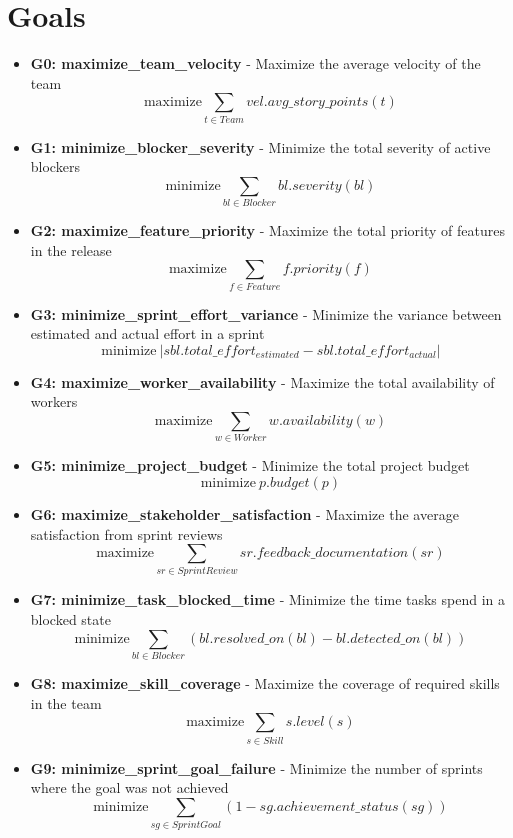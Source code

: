 \documentclass{article}
\begin{document}
\section{Goals}
\begin{itemize}
    \item \textbf{G0: maximize\_team\_velocity} - Maximize the average velocity of the team
        \[ \text{maximize} \sum_{t \in Team} vel.avg\_story\_points(t) \]
    \item \textbf{G1: minimize\_blocker\_severity} - Minimize the total severity of active blockers
        \[ \text{minimize} \sum_{bl \in Blocker} bl.severity(bl) \]
    \item \textbf{G2: maximize\_feature\_priority} - Maximize the total priority of features in the release
        \[ \text{maximize} \sum_{f \in Feature} f.priority(f) \]
    \item \textbf{G3: minimize\_sprint\_effort\_variance} - Minimize the variance between estimated and actual effort in a sprint
        \[ \text{minimize} \ | sbl.total\_effort_{estimated} - sbl.total\_effort_{actual} | \]
    \item \textbf{G4: maximize\_worker\_availability} - Maximize the total availability of workers
        \[ \text{maximize} \sum_{w \in Worker} w.availability(w) \]
    \item \textbf{G5: minimize\_project\_budget} - Minimize the total project budget
        \[ \text{minimize} \ p.budget(p) \]
    \item \textbf{G6: maximize\_stakeholder\_satisfaction} - Maximize the average satisfaction from sprint reviews
        \[ \text{maximize} \sum_{sr \in SprintReview} sr.feedback\_documentation(sr) \]
    \item \textbf{G7: minimize\_task\_blocked\_time} - Minimize the time tasks spend in a blocked state
        \[ \text{minimize} \sum_{bl \in Blocker} (bl.resolved\_on(bl) - bl.detected\_on(bl)) \]
    \item \textbf{G8: maximize\_skill\_coverage} - Maximize the coverage of required skills in the team
        \[ \text{maximize} \sum_{s \in Skill} s.level(s) \]
    \item \textbf{G9: minimize\_sprint\_goal\_failure} - Minimize the number of sprints where the goal was not achieved
        \[ \text{minimize} \sum_{sg \in SprintGoal} (1 - sg.achievement\_status(sg)) \]
\end{itemize}
\end{document}
